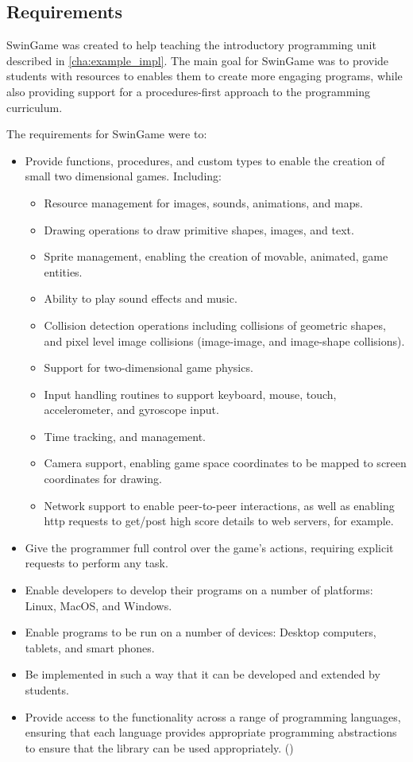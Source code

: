 \clearpage
\subsection{Requirements} %
\label{sub:swingame_requirements}

SwinGame was created to help teaching the introductory programming unit described in \cref{cha:example_impl}. The main goal for SwinGame was to provide students with resources to enables them to create more engaging programs, while also providing support for a procedures-first approach to the programming curriculum.

The requirements for SwinGame were to:
\begin{itemize}[noitemsep, nolistsep]
  \item Provide functions, procedures, and custom types to enable the creation of small two dimensional games. Including:
  \begin{itemize}[noitemsep,nolistsep]
    \item Resource management for images, sounds, animations, and maps.
    \item Drawing operations to draw primitive shapes, images, and text.
    \item Sprite management, enabling the creation of movable, animated, game entities.
    \item Ability to play sound effects and music.
    \item Collision detection operations including collisions of geometric shapes, and pixel level image collisions (image-image, and image-shape collisions).
    \item Support for two-dimensional game physics.
    \item Input handling routines to support keyboard, mouse, touch, accelerometer, and gyroscope input.
    \item Time tracking, and management.
    \item Camera support, enabling game space coordinates to be mapped to screen coordinates for drawing.
    \item Network support to enable peer-to-peer interactions, as well as enabling http requests to get/post high score details to web servers, for example.
  \end{itemize}
  \item Give the programmer full control over the game's actions, requiring explicit requests to perform any task.
  \item Enable developers to develop their programs on a number of platforms: Linux, MacOS, and Windows.
  \item Enable programs to be run on a number of devices: Desktop computers, tablets, and smart phones. 
  \item Be implemented in such a way that it can be developed and extended by students.
  \item Provide access to the functionality across a range of programming languages, ensuring that each language provides appropriate programming abstractions to ensure that the library can be used appropriately. ()
\end{itemize} 

